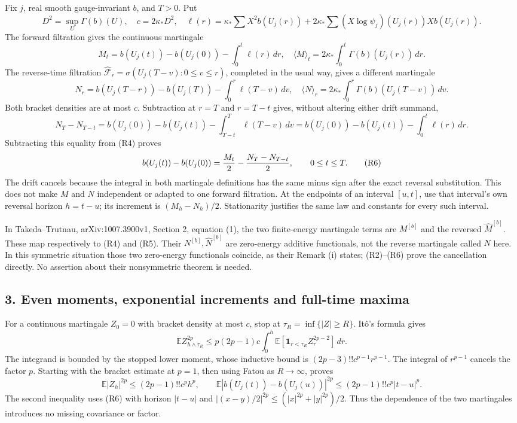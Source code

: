 \documentclass[11pt]{article}
\begin{document}
Fix \(j\), real smooth gauge-invariant \(b\), and \(T>0\). Put
\[
 D^2=\sup_U\Gamma(b)(U),\quad c=2\kappa_*D^2,\quad
 \ell(r)=\kappa_*\sum X^2b(U_j(r))+
       2\kappa_*\sum (X\log\psi_j)(U_j(r))Xb(U_j(r)).
 \tag{R3}
\]
The forward filtration gives the continuous martingale
\[
 M_t=b(U_j(t))-b(U_j(0))-\int_0^t\ell(r)\,dr,\quad
 \langle M\rangle_t=2\kappa_*\int_0^t\Gamma(b)(U_j(r))\,dr.
 \tag{R4}
\]
The reverse-time filtration
\(\widehat{\mathcal F}_r=\sigma(U_j(T-v):0\le v\le r)\), completed
in the usual way, gives a different martingale
\[
 N_r=b(U_j(T-r))-b(U_j(T))-\int_0^r\ell(T-v)\,dv,\quad
 \langle N\rangle_r=2\kappa_*\int_0^r\Gamma(b)(U_j(T-v))\,dv.
 \tag{R5}
\]
Both bracket densities are at most \(c\). Subtraction at \(r=T\)
and \(r=T-t\) gives, without altering either drift summand,
\[
 N_T-N_{T-t}=b(U_j(0))-b(U_j(t))-\int_{T-t}^T\ell(T-v)\,dv
            =b(U_j(0))-b(U_j(t))-\int_0^t\ell(r)\,dr.
\]
Subtracting this equality from (R4) proves
\[
 b(U_j(t))-b(U_j(0))
       ={M_t\over2}-{N_T-N_{T-t}\over2},\qquad 0\le t\le T.
 \tag{R6}
\]
The drift cancels because the integral in both martingale definitions
has the same minus sign after the exact reversal substitution.
This does not make \(M\) and \(N\) independent or adapted to one
forward filtration. At the endpoints of an interval \([u,t]\), use
that interval's own reversal horizon \(h=t-u\); its increment is
\((M_h-N_h)/2\). Stationarity justifies the same law and constants
for every such interval.

In Takeda–Trutnau, arXiv:1007.3900v1, Section 2, equation (1),
the two finite-energy martingale terms are \(M^{[b]}\) and the
reversed \(\widehat M^{[b]}\). These map respectively to (R4) and
(R5). Their \(N^{[b]},\widehat N^{[b]}\) are zero-energy additive
functionals, not the reverse martingale called \(N\) here.
In this symmetric situation those two zero-energy functionals coincide,
as their Remark (i) states; (R2)–(R6) prove the cancellation directly.
No assertion about their nonsymmetric theorem is needed.

\subsection*{3. Even moments, exponential increments and full-time maxima}

For a continuous martingale \(Z_0=0\) with bracket density at most
\(c\), stop at \(\tau_R=\inf\{|Z|\ge R\}\). Itô's formula gives
\[
 \mathbb E Z_{h\wedge\tau_R}^{2p}
 \le p(2p-1)c\int_0^h
  \mathbb E[\mathbf1_{r<\tau_R}Z_r^{2p-2}]\,dr.
\]
The integrand is bounded by the stopped lower moment, whose
inductive bound is \((2p-3)!!c^{p-1}r^{p-1}\).
The integral of \(r^{p-1}\) cancels the factor \(p\).
Starting with the bracket estimate at \(p=1\), then using Fatou as
\(R\to\infty\), proves
\[
 \mathbb E|Z_h|^{2p}\le (2p-1)!!c^ph^p,\qquad
 \mathbb E|b(U_j(t))-b(U_j(u))|^{2p}
 \le (2p-1)!!c^p|t-u|^p. \tag{R7}
\]
The second inequality uses (R6) with horizon \(|t-u|\) and
\(|(x-y)/2|^{2p}\le(|x|^{2p}+|y|^{2p})/2\).
Thus the dependence of the two martingales introduces no missing
covariance or factor.
\end{document}
